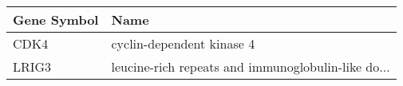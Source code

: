 \begin{tabular}{ll}
\toprule
Gene Symbol &                                               Name \\
\midrule
       CDK4 &                          cyclin-dependent kinase 4 \\
      LRIG3 & leucine-rich repeats and immunoglobulin-like do... \\
\bottomrule
\end{tabular}
